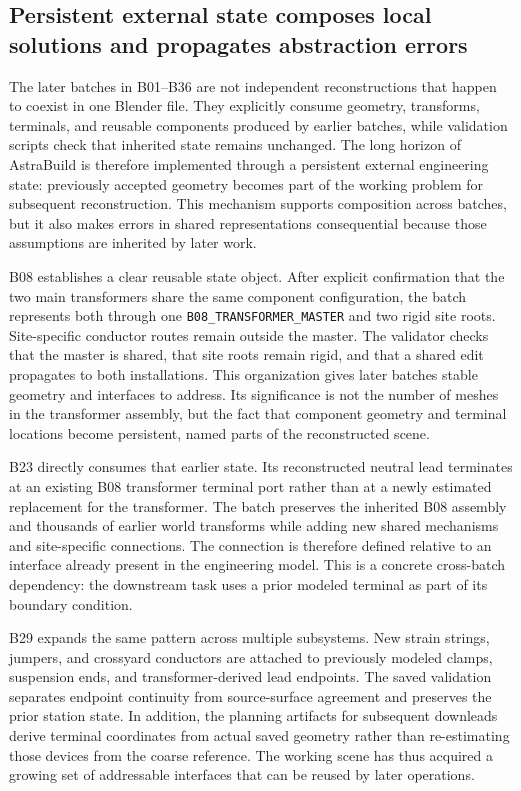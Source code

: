 \documentclass[10pt,a4paper]{article}
\begin{document}
\hypertarget{persistent-external-state-composes-local-solutions-and-propagates-abstraction-errors}{%
\subsection{Persistent external state composes local solutions and
propagates abstraction
errors}\label{persistent-external-state-composes-local-solutions-and-propagates-abstraction-errors}}

The later batches in B01--B36 are not independent reconstructions that
happen to coexist in one Blender file. They explicitly consume geometry,
transforms, terminals, and reusable components produced by earlier
batches, while validation scripts check that inherited state remains
unchanged. The long horizon of AstraBuild is therefore implemented
through a persistent external engineering state: previously accepted
geometry becomes part of the working problem for subsequent
reconstruction. This mechanism supports composition across batches, but
it also makes errors in shared representations consequential because
those assumptions are inherited by later work.

B08 establishes a clear reusable state object. After explicit
confirmation that the two main transformers share the same component
configuration, the batch represents both through one
\texttt{B08\_TRANSFORMER\_MASTER} and two rigid site roots.
Site-specific conductor routes remain outside the master. The validator
checks that the master is shared, that site roots remain rigid, and that
a shared edit propagates to both installations. This organization gives
later batches stable geometry and interfaces to address. Its
significance is not the number of meshes in the transformer assembly,
but the fact that component geometry and terminal locations become
persistent, named parts of the reconstructed scene.

B23 directly consumes that earlier state. Its reconstructed neutral lead
terminates at an existing B08 transformer terminal port rather than at a
newly estimated replacement for the transformer. The batch preserves the
inherited B08 assembly and thousands of earlier world transforms while
adding new shared mechanisms and site-specific connections. The
connection is therefore defined relative to an interface already present
in the engineering model. This is a concrete cross-batch dependency: the
downstream task uses a prior modeled terminal as part of its boundary
condition.

B29 expands the same pattern across multiple subsystems. New strain
strings, jumpers, and crossyard conductors are attached to previously
modeled clamps, suspension ends, and transformer-derived lead endpoints.
The saved validation separates endpoint continuity from source-surface
agreement and preserves the prior station state. In addition, the
planning artifacts for subsequent downleads derive terminal coordinates
from actual saved geometry rather than re-estimating those devices from
the coarse reference. The working scene has thus acquired a growing set
of addressable interfaces that can be reused by later operations.
\end{document}
